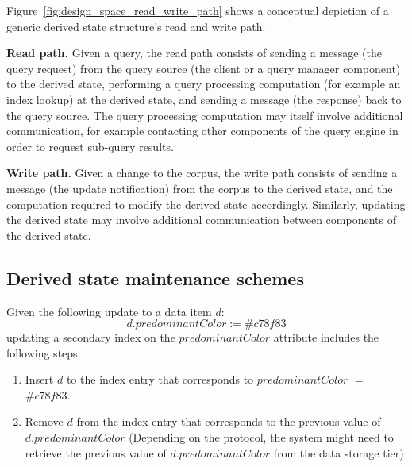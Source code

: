 \noindent
Figure~\ref{fig:design_space_read_write_path} shows a conceptual depiction of a generic derived state structure's read
and write path.

\textbf{Read path.}
Given a query, the read path consists of sending a message (the query request) from the query source (the client or a query manager component)
to the derived state, performing a query processing computation (for example an index lookup) at the derived state,
and sending a message (the response) back to the query source.
The query processing computation may itself involve additional communication, for example contacting other components of
the query engine in order to request sub-query results.

\textbf{Write path.}
Given a change to the corpus,
the write path consists of sending a message (the update notification) from the corpus to the derived state,
and the computation required to modify the derived state accordingly.
Similarly, updating the derived state may involve additional communication between components of the derived state.


\subsection{Derived state maintenance schemes}
\label{sec:sync_async_maintenance}


Given the following update to a data item $d$:
\[
d.predominantColor := \#c78f83
\]
updating a secondary index on the $predominantColor$ attribute includes the following steps:
\begin{enumerate}
  \item Insert $d$ to the index entry that corresponds to $predominantColor$ $=$ $\#c78f83$.
  \item Remove $d$ from the index entry that corresponds to the previous value of $d.predominantColor$
  (Depending on the protocol, the system might need to retrieve the previous value of $d.predominantColor$ from the data
  storage tier)
\end{enumerate}

